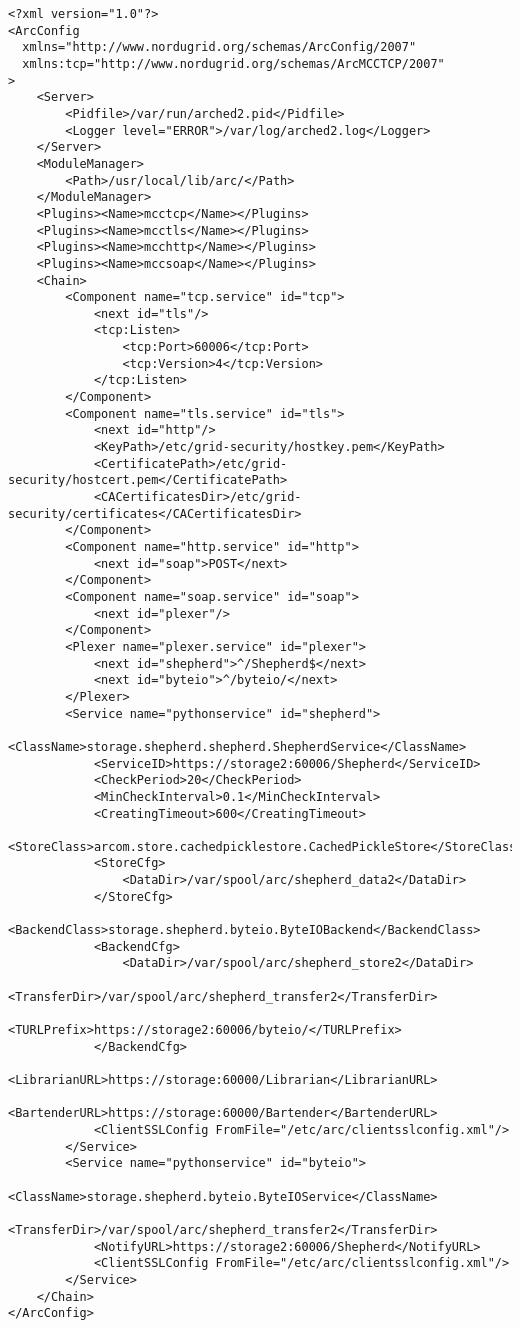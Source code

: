 \documentclass{article}
\begin{document}
\begin{verbatim}
<?xml version="1.0"?>
<ArcConfig 
  xmlns="http://www.nordugrid.org/schemas/ArcConfig/2007"
  xmlns:tcp="http://www.nordugrid.org/schemas/ArcMCCTCP/2007"
>
    <Server>
        <Pidfile>/var/run/arched2.pid</Pidfile>
        <Logger level="ERROR">/var/log/arched2.log</Logger>
    </Server>
    <ModuleManager>
        <Path>/usr/local/lib/arc/</Path>
    </ModuleManager>
    <Plugins><Name>mcctcp</Name></Plugins>
    <Plugins><Name>mcctls</Name></Plugins>
    <Plugins><Name>mcchttp</Name></Plugins>
    <Plugins><Name>mccsoap</Name></Plugins>
    <Chain>
        <Component name="tcp.service" id="tcp">
            <next id="tls"/> 
            <tcp:Listen>
                <tcp:Port>60006</tcp:Port>
                <tcp:Version>4</tcp:Version>
            </tcp:Listen>
        </Component>
        <Component name="tls.service" id="tls">
            <next id="http"/>
            <KeyPath>/etc/grid-security/hostkey.pem</KeyPath>
            <CertificatePath>/etc/grid-security/hostcert.pem</CertificatePath>
            <CACertificatesDir>/etc/grid-security/certificates</CACertificatesDir>
        </Component>
        <Component name="http.service" id="http">
            <next id="soap">POST</next>
        </Component>
        <Component name="soap.service" id="soap">
            <next id="plexer"/>
        </Component>
        <Plexer name="plexer.service" id="plexer">
            <next id="shepherd">^/Shepherd$</next>
            <next id="byteio">^/byteio/</next>
        </Plexer>
        <Service name="pythonservice" id="shepherd">
            <ClassName>storage.shepherd.shepherd.ShepherdService</ClassName>
            <ServiceID>https://storage2:60006/Shepherd</ServiceID>
            <CheckPeriod>20</CheckPeriod>
            <MinCheckInterval>0.1</MinCheckInterval>
            <CreatingTimeout>600</CreatingTimeout>
            <StoreClass>arcom.store.cachedpicklestore.CachedPickleStore</StoreClass>
            <StoreCfg>
                <DataDir>/var/spool/arc/shepherd_data2</DataDir>
            </StoreCfg>
            <BackendClass>storage.shepherd.byteio.ByteIOBackend</BackendClass>
            <BackendCfg>
                <DataDir>/var/spool/arc/shepherd_store2</DataDir>
                <TransferDir>/var/spool/arc/shepherd_transfer2</TransferDir>
                <TURLPrefix>https://storage2:60006/byteio/</TURLPrefix>
            </BackendCfg>
            <LibrarianURL>https://storage:60000/Librarian</LibrarianURL>
            <BartenderURL>https://storage:60000/Bartender</BartenderURL>
            <ClientSSLConfig FromFile="/etc/arc/clientsslconfig.xml"/>
        </Service>
        <Service name="pythonservice" id="byteio">
            <ClassName>storage.shepherd.byteio.ByteIOService</ClassName>
            <TransferDir>/var/spool/arc/shepherd_transfer2</TransferDir>
            <NotifyURL>https://storage2:60006/Shepherd</NotifyURL>
            <ClientSSLConfig FromFile="/etc/arc/clientsslconfig.xml"/>
        </Service>
    </Chain>
</ArcConfig>    
\end{verbatim}
\end{document}

